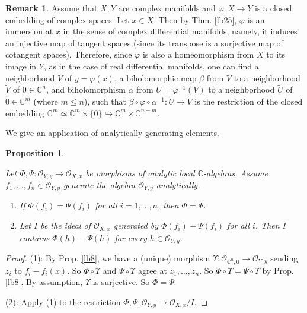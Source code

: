 \documentclass[12pt,b5paper,notitlepage]{report}
\theoremstyle{definition}
\newtheorem{rem}[df]{Remark}
\theoremstyle{plain}
\newtheorem{pp}[df]{Proposition}
\newcommand{\wtd}{\widetilde}
\newcommand{\scr}{\mathscr}
\newcommand{\Cbb}{\mathbb C}
\numberwithin{equation}{section}
\begin{document}
\begin{rem}\label{lb191}
Assume that $X,Y$ are complex manifolds and $\varphi:X\rightarrow Y$ is a closed embedding of complex spaces. Let $x\in X$. Then by Thm. \ref{lb25},  $\varphi$ is an immersion at $x$ in the sense of complex differential manifolds, namely, it induces an injective map of tangent spaces (since its transpose is a surjective map of cotangent spaces). Therefore, since $\varphi$ is also a homeomorphism from $X$ to its image in $Y$, as in the case of real differential manifolds, one can find a neighborhood $V$ of $y=\varphi(x)$, a  biholomorphic map $\beta$ from $V$ to a neighborhood $\wtd V$ of $0\in\Cbb^n$, and biholomorphism $\alpha$ from $U=\varphi^{-1}(V)$ to a neighborhood $\wtd U$ of $0\in\Cbb^m$ (where $m\leq n$), such that $\beta\circ\varphi\circ\alpha^{-1}:\wtd U\rightarrow\wtd V$ is the restriction of the closed embedding $\Cbb^m\simeq\Cbb^m\times\{0\}\hookrightarrow\Cbb^m\times\Cbb^{n-m}$.
\end{rem}



We give an application of analytically generating elements.


\begin{pp}\label{lb24}

\item Let $\Phi,\Psi:\scr O_{Y,y}\rightarrow\scr O_{X,x}$ be morphisms of analytic local $\Cbb$-algebras. Assume $f_1,\dots,f_n\in\scr O_{Y,y}$ generate the algebra $\scr O_{Y,y}$ analytically. 
\begin{enumerate}[label=(\arabic*)]
\item If $\Phi(f_i)=\Psi(f_i)$ for all $i=1,\dots,n$, then $\Phi=\Psi$.
\item Let $I$ be the ideal of $\scr O_{X,x}$ generated by $\Phi(f_i)-\Psi(f_i)$ for all $i$. Then $I$ contains $\Phi(h)-\Psi(h)$ for every $h\in\scr O_{Y,y}$.
\end{enumerate}
\end{pp}

\begin{proof}
(1): By Prop. \ref{lb8}, we have a (unique) morphism $\Upsilon:\scr O_{\Cbb^n,0}\rightarrow\scr O_{Y,y}$ sending $z_i$ to $f_i-f_i(x)$. So $\Phi\circ\Upsilon$ and $\Psi\circ\Upsilon$ agree at $z_1,\dots,z_n$. So $\Phi\circ\Upsilon=\Psi\circ\Upsilon$ by Prop. \ref{lb8}. By assumption, $\Upsilon$ is surjective. So $\Phi=\Psi$. 

(2): Apply (1) to the restriction $\Phi,\Psi:\scr O_{Y,y}\rightarrow\scr O_{X,x}/I$.
\end{proof}
\end{document}
